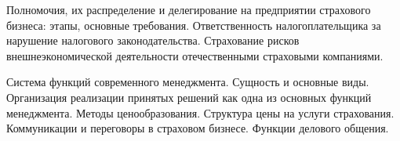 \documentclass[
	11pt,
	a4paper,
	]
	{article}
\begin{document}
\bigskip

\noindent{} 
	{
		Полномочия, их распределение и делегирование на предприятии страхового бизнеса: этапы, основные требования.
	}{
		Ответственность налогоплательщика за нарушение налогового законодательства.
	}{
		Страхование рисков внешнеэкономической деятельности отечественными страховыми компаниями.
	}

\bigskip

\noindent{} 
	{
		Система функций современного менеджмента. Сущность и основные виды. Организация реализации принятых решений как одна из основных функций менеджмента.
	}{
		Методы ценообразования. Структура цены на услуги страхования.
	}{
		Коммуникации и переговоры в страховом бизнесе. Функции делового общения.
	}

\bigskip
\end{document}
